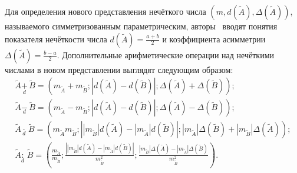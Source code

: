 Для определения нового представления нечёткого числа $\left( m,d\left( {\tilde{A}} \right),\Delta \left( {\tilde{A}} \right) \right)$, называемого симметризованным параметрическим, авторы~\cite{Piter_SCM} вводят понятия показателя нечёткости числа $\displaystyle d\left( {\tilde{A}} \right)=\frac{a+b}{2}$ и коэффициента асимметрии $\displaystyle \Delta \left( {\tilde{A}} \right)=\frac{b-a}{2}$. Дополнительные арифметические операции над нечёткими числами в новом представлении выглядят следующим образом:
\begin{gather*}
		\tilde{A}\underset{d}{\mathop{+}}\,\tilde{B}=\left( {{m}_{{\tilde{A}}}}+{{m}_{{\tilde{B}}}};\left| d\left( {\tilde{A}} \right)-d\left( {\tilde{B}} \right) \right|;\Delta \left( {\tilde{A}} \right)+\Delta \left( {\tilde{B}} \right) \right); \\ 
		\tilde{A}\underset{d}{\mathop{-}}\,\tilde{B}=\left( {{m}_{{\tilde{A}}}}-{{m}_{{\tilde{B}}}};\left| d\left( {\tilde{A}} \right)-d\left( {\tilde{B}} \right) \right|;\Delta \left( {\tilde{A}} \right)-\Delta \left( {\tilde{B}} \right) \right); \\ 
		\tilde{A}\underset{d}{\mathop{\cdot }}\,\tilde{B}=\left( {{m}_{{\tilde{A}}}}{{m}_{{\tilde{B}}}};\left| \left| {{m}_{{\tilde{B}}}} \right|d\left( {\tilde{A}} \right)-\left| {{m}_{{\tilde{A}}}} \right|d\left( {\tilde{B}} \right) \right|;\left| {{m}_{{\tilde{A}}}} \right|\Delta \left( {\tilde{B}} \right)+\left| {{m}_{{\tilde{B}}}} \right|\Delta \left( {\tilde{A}} \right) \right); \\ 
		\tilde{A}\underset{d}{\mathop{:}}\,\tilde{B}=\left( \frac{{{m}_{{\tilde{A}}}}}{{{m}_{{\tilde{B}}}}};\frac{\left| \left| {{m}_{{\tilde{B}}}} \right|d\left( {\tilde{A}} \right)-\left| {{m}_{{\tilde{A}}}} \right|d\left( {\tilde{B}} \right) \right|}{m_{{\tilde{B}}}^{2}};\frac{\left| {{m}_{{\tilde{B}}}} \right|\Delta \left( {\tilde{A}} \right)-\left| {{m}_{{\tilde{A}}}} \right|\Delta \left( {\tilde{B}} \right)}{m_{{\tilde{B}}}^{2}} \right).
\end{gather*}

